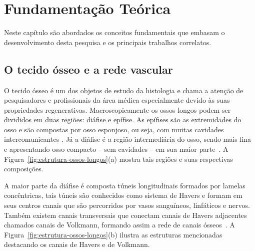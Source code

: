 \chapter[Fundamentação Teórica]{Fundamentação Teórica}

Neste capítulo são abordados os conceitos fundamentais que embasam o desenvolvimento desta pesquisa e os principais trabalhos correlatos.

\section{O tecido ósseo e a rede vascular}
O tecido ósseo é um dos objetos de estudo da histologia e chama a atenção de pesquisadores e profissionais da área médica especialmente devido às suas propriedades regenerativas. Macroscopicamente os ossos longos podem ser divididos em duas regiões: diáfise e epífise. As epífises são as extremidades do osso e são compostas por osso esponjoso, ou seja, com muitas cavidades intercomunicantes \cite{junqueira1985histologia}. Já a diáfise é a região intermediária do osso, sendo mais fina e apresentando osso compacto -- sem cavidades -- em sua maior parte~\cite{junqueira1985histologia}. A Figura~\ref{fig:estrutura-ossos-longos}(a) mostra tais regiões e suas respectivas composições.

A maior parte da diáfise é composta túneis longitudinais formados por lamelas concêntricas, tais túneis são conhecidos como sistema de Havers e formam em seus centros canais que são percorridos por vasos sanguíneos, linfáticos e nervos. Também existem canais transversais que conectam canais de Havers adjacentes chamados canais de Volkmann, formando assim a rede de canais ósseos~\cite{junqueira1985histologia}. A Figura~\ref{fig:estrutura-ossos-longos}(b) ilustra as estruturas mencionadas destacando os canais de Havers e de Volkmann.

